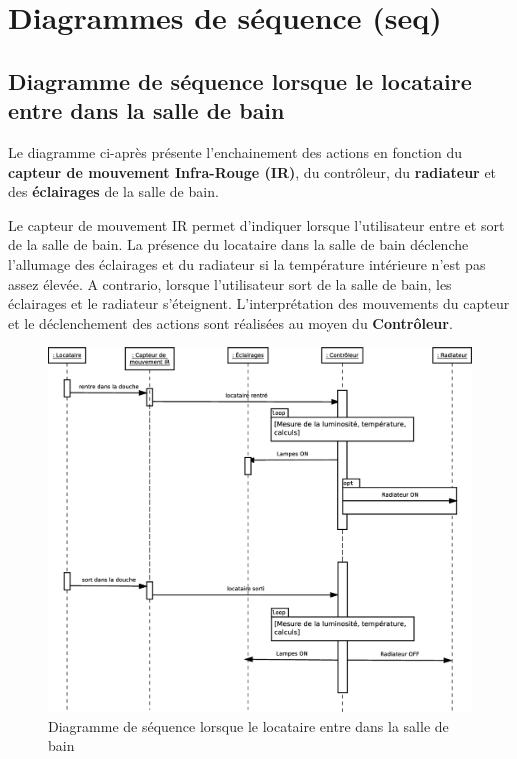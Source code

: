 \chapter{Diagrammes de séquence (seq)}
\section{Diagramme de séquence lorsque le locataire entre dans la salle de bain}
Le diagramme ci-après présente l'enchainement des actions en fonction du \textbf{capteur de mouvement Infra-Rouge (IR)}, du contrôleur, du \textbf{radiateur} et des \textbf{éclairages} de la salle de bain.

Le capteur de mouvement IR permet d'indiquer lorsque l'utilisateur entre et sort de la salle de bain. La présence du locataire dans la salle de bain déclenche l'allumage des éclairages et du radiateur si la température intérieure n'est pas assez élevée. A contrario, lorsque l'utilisateur sort de la salle de bain, les éclairages et le radiateur s'éteignent. L'interprétation des mouvements du capteur et le déclenchement des actions sont réalisées au moyen du \textbf{Contrôleur}.
\newpage

\begin{figure}[H]
	\centering
	\includegraphics[width=1\linewidth]{diagrams/bathroom/diagramme_sequence.eps}
	\caption{Diagramme de séquence lorsque le locataire entre dans la salle de bain}
	\label{fig:diagramme_seq1}
\end{figure}
\pagebreak

